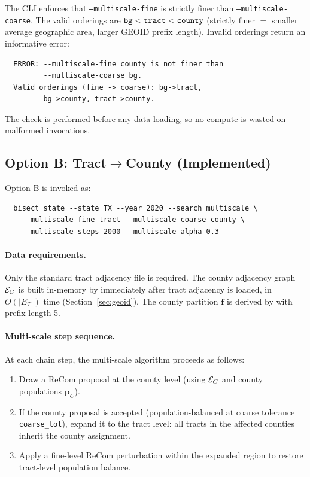 The CLI enforces that \texttt{--multiscale-fine} is strictly finer than
\texttt{--multiscale-coarse}.
The valid orderings are $\texttt{bg} < \texttt{tract} < \texttt{county}$ (strictly finer
$=$ smaller average geographic area, larger GEOID prefix length).
Invalid orderings return an informative error:

\begin{verbatim}
  ERROR: --multiscale-fine county is not finer than
         --multiscale-coarse bg.
  Valid orderings (fine -> coarse): bg->tract,
         bg->county, tract->county.
\end{verbatim}

\noindent
The check is performed before any data loading, so no compute is wasted
on malformed invocations.

\subsection{Option B: Tract$\to$County (Implemented)}
\label{ssec:optionb}

Option B is invoked as:
\begin{verbatim}
  bisect state --state TX --year 2020 --search multiscale \
    --multiscale-fine tract --multiscale-coarse county \
    --multiscale-steps 2000 --multiscale-alpha 0.3
\end{verbatim}

\paragraph{Data requirements.}
Only the standard tract adjacency file is required.
The county adjacency graph $\mathcal{E}_C$ is built in-memory by \buildc{}
immediately after tract adjacency is loaded, in $O(|E_T|)$ time
(Section~\ref{sec:geoid}).
The county partition $\mathbf{f}$ is derived by \derive{}
with prefix length 5.

\paragraph{Multi-scale step sequence.}
At each chain step, the multi-scale algorithm proceeds as follows:

\begin{enumerate}
  \item Draw a ReCom proposal at the county level (using $\mathcal{E}_C$ and
        county populations $\mathbf{p}_C$).
  \item If the county proposal is accepted (population-balanced at
        coarse tolerance \texttt{coarse\_tol}), expand it to the
        tract level: all tracts in the affected counties inherit
        the county assignment.
  \item Apply a fine-level ReCom perturbation within the expanded region
        to restore tract-level population balance.
\end{enumerate}

